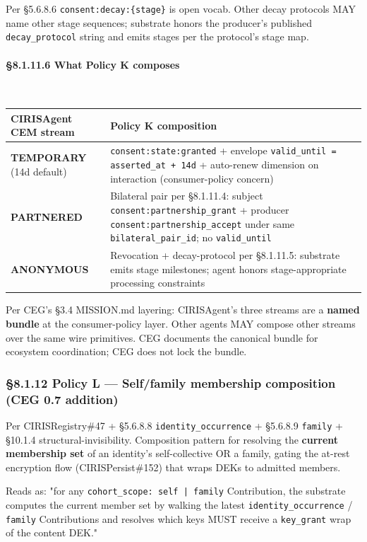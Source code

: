 \documentclass[11pt]{article}
\begin{document}
Per §5.6.8.6 \texttt{consent:decay:\{stage\}} is open vocab. Other decay protocols MAY name other stage sequences; substrate honors the producer's published \texttt{decay\_protocol} string and emits stages per the protocol's stage map.


\paragraph{§8.1.11.6 What Policy K composes}\mbox{}\\


{\footnotesize
\begin{longtable}{|p{8.0cm}|p{8.0cm}|}\hline
\textbf{CIRISAgent CEM stream} & \textbf{Policy K composition} \\ \hline\endhead
\textbf{TEMPORARY} (14d default) & \texttt{consent:state:granted} + envelope \texttt{valid\_until = asserted\_at + 14d} + auto-renew dimension on interaction (consumer-policy concern) \\ \hline
\textbf{PARTNERED} & Bilateral pair per §8.1.11.4: subject \texttt{consent:partnership\_grant} + producer \texttt{consent:partnership\_accept} under same \texttt{bilateral\_pair\_id}; no \texttt{valid\_until} \\ \hline
\textbf{ANONYMOUS} & Revocation + decay-protocol per §8.1.11.5: substrate emits stage milestones; agent honors stage-appropriate processing constraints \\ \hline
\end{longtable}}


Per CEG's §3.4 MISSION.md layering: CIRISAgent's three streams are a \textbf{named bundle} at the consumer-policy layer. Other agents MAY compose other streams over the same wire primitives. CEG documents the canonical bundle for ecosystem coordination; CEG does not lock the bundle.


\subsubsection*{§8.1.12 Policy L — Self/family membership composition (CEG 0.7 addition)}


Per CIRISRegistry\#47 + §5.6.8.8 \texttt{identity\_occurrence} + §5.6.8.9 \texttt{family} + §10.1.4 structural-invisibility. Composition pattern for resolving the \textbf{current membership set} of an identity's self-collective OR a family, gating the at-rest encryption flow (CIRISPersist\#152) that wraps DEKs to admitted members.


Reads as: "for any \texttt{cohort\_scope: self | family} Contribution, the substrate computes the current member set by walking the latest \texttt{identity\_occurrence} / \texttt{family} Contributions and resolves which keys MUST receive a \texttt{key\_grant} wrap of the content DEK."
\end{document}

